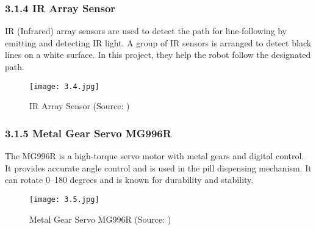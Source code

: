 \subsubsection*{3.1.4 IR Array Sensor}
IR (Infrared) array sensors are used to detect the path for line-following by emitting and detecting IR light. A group of IR sensors is arranged to detect black lines on a white surface. In this project, they help the robot follow the designated path.

\begin{figure}[H]
    \centering
    \texttt{[image: 3.4.jpg]}
    \caption{IR Array Sensor (Source: \cite{10})}
    \label{fig:3.4}
\end{figure}

\subsubsection*{3.1.5 Metal Gear Servo MG996R}
The MG996R is a high-torque servo motor with metal gears and digital control. It provides accurate angle control and is used in the pill dispensing mechanism. It can rotate 0–180 degrees and is known for durability and stability.

\begin{figure}[H]
    \centering
    \texttt{[image: 3.5.jpg]}
    \caption{Metal Gear Servo MG996R (Source: \cite{11})}
    \label{fig:3.5}
\end{figure}
